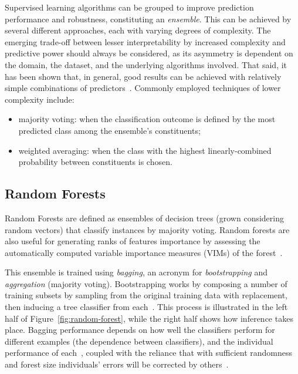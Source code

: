 Supervised learning algorithms can be grouped to improve prediction performance and robustness, constituting an \textit{ensemble}.
This can be achieved by several different approaches, each with varying degrees of complexity.
The emerging trade-off between lesser interpretability by increased complexity and predictive power should always be considered, as its asymmetry is dependent on the domain, the dataset, and the underlying algorithms involved.
That said, it has been shown that, in general, good results can be achieved with relatively simple combinations of predictors~\cite{Clemen1989}.
Commonly employed techniques of lower complexity include:
\begin{itemize}
    \item majority voting: when the classification outcome is defined by the most predicted class among the ensemble's constituents;
    \item weighted averaging: when the class with the highest linearly-combined probability between constituents is chosen.
\end{itemize}

\subsection{Random Forests}\label{subsec:random_forests}

Random Forests are defined as ensembles of decision trees (grown considering random vectors) that classify instances by majority voting\cite{Breiman2001}.
Random forests are also useful for generating ranks of features importance by assessing the automatically computed variable importance measures (VIMs) of the forest~\cite{Boulesteix2012}.

This ensemble is trained using \textit{bagging}, an acronym for \textit{bootstrapping} and \textit{aggregation} (majority voting).
Bootstrapping works by composing a number of training subsets by sampling from the original training data with replacement, then inducing a tree classifier from each~\cite{Kubat2017}.
This process is illustrated in the left half of Figure~\ref{fig:random-forest}, while the right half shows how inference takes place.
Bagging performance depends on how well the classifiers perform for different examples (the dependence between classifiers), and the individual performance of each~\cite{Breiman2001}, coupled with the reliance that with sufficient randomness and forest size individuals' errors will be corrected by others~\cite{Kubat2017}.

